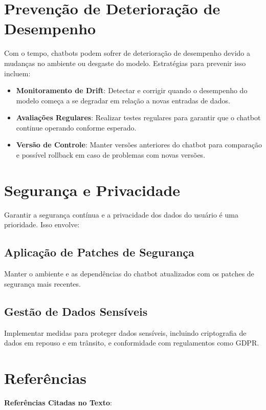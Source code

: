 \documentclass[14pt,a4paper,oneside]{book}
\begin{document}
\section{Prevenção de Deterioração de Desempenho}

Com o tempo, chatbots podem sofrer de deterioração de desempenho devido a mudanças no ambiente ou desgaste do modelo. Estratégias para prevenir isso incluem:

\begin{itemize}
	\item \textbf{Monitoramento de Drift}: Detectar e corrigir quando o desempenho do modelo começa a se degradar em relação a novas entradas de dados.
	\item \textbf{Avaliações Regulares}: Realizar testes regulares para garantir que o chatbot continue operando conforme esperado.
	\item \textbf{Versão de Controle}: Manter versões anteriores do chatbot para comparação e possível rollback em caso de problemas com novas versões.
\end{itemize}

\section{Segurança e Privacidade}

Garantir a segurança contínua e a privacidade dos dados do usuário é uma prioridade. Isso envolve:

\subsection{Aplicação de Patches de Segurança}

Manter o ambiente e as dependências do chatbot atualizados com os patches de segurança mais recentes.

\subsection{Gestão de Dados Sensíveis}

Implementar medidas para proteger dados sensíveis, incluindo criptografia de dados em repouso e em trânsito, e conformidade com regulamentos como GDPR.

\section{Referências}

\textbf{Referências Citadas no Texto}:
\end{document}
